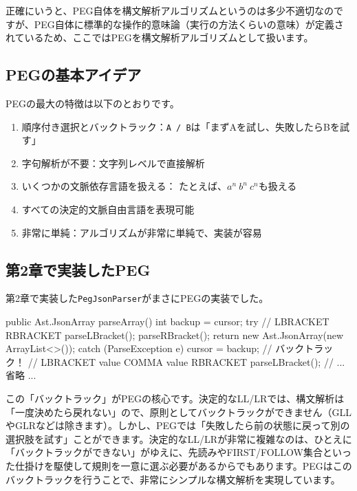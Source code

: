 正確にいうと、PEG自体を構文解析アルゴリズムというのは多少不適切なのですが、PEG自体に標準的な操作的意味論（実行の方法くらいの意味）が定義されているため、ここではPEGを構文解析アルゴリズムとして扱います。

\subsection{PEGの基本アイデア}

PEGの最大の特徴は以下のとおりです。

\begin{enumerate}
\item
  順序付き選択とバックトラック：\texttt{A\ /\ B}は「まずAを試し、失敗したらBを試す」
\item
  字句解析が不要：文字列レベルで直接解析
\item
  いくつかの文脈依存言語を扱える：
  たとえば、\(a^n\ b^n\ c^n\)も扱える
\item
  すべての決定的文脈自由言語を表現可能
\item
  非常に単純：アルゴリズムが非常に単純で、実装が容易
\end{enumerate}

\subsection{第2章で実装したPEG}

第2章で実装した\texttt{PegJsonParser}がまさにPEGの実装でした。

\begin{codescreen}{}
public Ast.JsonArray parseArray() {
    int backup = cursor;
    try {
        // LBRACKET RBRACKET
        parseLBracket();
        parseRBracket();
        return new Ast.JsonArray(new ArrayList<>());
    } catch (ParseException e) {
        cursor = backup;  // バックトラック！
        // LBRACKET value {COMMA value} RBRACKET
        parseLBracket();
        // ... 省略 ...
    }
}
\end{codescreen}

この「バックトラック」がPEGの核心です。決定的なLL/LRでは、構文解析は「一度決めたら戻れない」ので、原則としてバックトラックができません（GLLやGLRなどは除きます）。しかし、PEGでは「失敗したら前の状態に戻って別の選択肢を試す」ことができます。決定的なLL/LRが非常に複雑なのは、ひとえに「バックトラックができない」がゆえに、先読みやFIRST/FOLLOW集合といった仕掛けを駆使して規則を一意に選ぶ必要があるからでもあります。PEGはこのバックトラックを行うことで、非常にシンプルな構文解析を実現しています。

